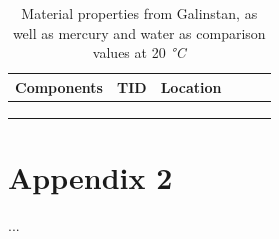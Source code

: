 \begin{table}[htb]
\centering
\caption{Material properties from Galinstan, as well as mercury and water as comparison values at 20 \textit{°C}}
\begin{adjustbox}{max width=\textwidth}
\begin{tabular}[l]{lccccc}

	\toprule
		Components	&	TID	&	Location\\
	\midrule
	
	
		&		&	 \\	
	
	
		&		&	\\
	
	
	 &		&	\\
	

	\bottomrule

\end{tabular}
\end{adjustbox}
\label{tab:RadiationList}
\end{table}

\clearpage

\section{Appendix 2}
\label{sec:Appendix2}

...

\cleardoublepage